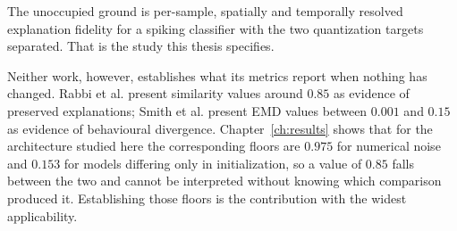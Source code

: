The unoccupied ground is per-sample, spatially and temporally resolved
explanation fidelity for a spiking classifier with the two quantization targets
separated. That is the study this thesis specifies.

Neither work, however, establishes what its metrics report when nothing has
changed. Rabbi et al. present similarity values around $0.85$ as evidence of
preserved explanations; Smith et al. present EMD values between $0.001$ and
$0.15$ as evidence of behavioural divergence. Chapter~\ref{ch:results} shows
that for the architecture studied here the corresponding floors are $0.975$ for
numerical noise and $0.153$ for models differing only in initialization, so a
value of $0.85$ falls between the two and cannot be interpreted without knowing
which comparison produced it. Establishing those floors is the contribution with
the widest applicability.
